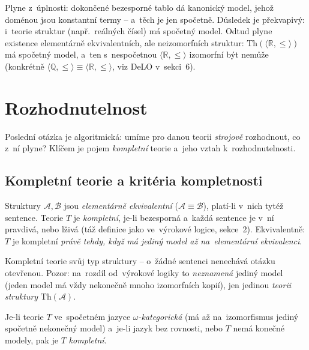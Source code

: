 \documentclass[11pt,a4paper]{article}
\begin{document}
\begin{intuice}
Plyne z~úplnosti: dokončené bezesporné tablo dá kanonický model, jehož doménou jsou konstantní termy -- a~těch je jen spočetně. Důsledek je překvapivý: i~teorie  struktur (např.\ reálných čísel) má spočetný model. Odtud plyne existence elementárně ekvivalentních, ale neizomorfních struktur: $\mathrm{Th}(\langle\mathbb{R},\le\rangle)$ má spočetný model, a~ten s~nespočetnou $\langle\mathbb{R},\le\rangle$ izomorfní být nemůže (konkrétně $\langle\mathbb{Q},\le\rangle\equiv\langle\mathbb{R},\le\rangle$, viz DeLO v~sekci~6).
\end{intuice}

\section{Rozhodnutelnost}

Poslední otázka je algoritmická: umíme pro danou teorii \emph{strojově} rozhodnout, co z~ní plyne? Klíčem je pojem \emph{kompletní} teorie a~jeho vztah k~rozhodnutelnosti.

\subsection{Kompletní teorie a kritéria kompletnosti}

\begin{definice}
Struktury $\mathcal A,\mathcal B$ jsou \emph{elementárně ekvivalentní} ($\mathcal A\equiv\mathcal B$), platí-li v~nich tytéž sentence. Teorie $T$ je \emph{kompletní}, je-li bezesporná a~každá sentence je v~ní pravdivá, nebo lživá (táž definice jako ve~výrokové logice, sekce~2). Ekvivalentně: $T$ je kompletní \emph{právě tehdy, když má jediný model až na~elementární ekvivalenci}.
\end{definice}

\begin{intuice}
Kompletní teorie  svůj typ struktury -- o~žádné sentenci nenechává otázku otevřenou. Pozor: na~rozdíl od~výrokové logiky to \emph{neznamená} jediný model (jeden model má vždy nekonečně mnoho izomorfních kopií), jen jedinou \emph{teorii struktury} $\mathrm{Th}(\mathcal A)$.
\end{intuice}

\begin{veta}
Je-li teorie $T$ ve~spočetném jazyce \emph{$\omega$-kategorická} (má až na~izomorfismus jediný spočetně nekonečný model) a~je-li jazyk bez rovnosti, nebo $T$ nemá konečné modely, pak je $T$ \emph{kompletní}.
\end{veta}
\end{document}
